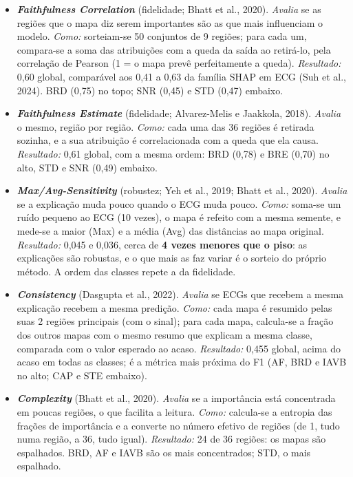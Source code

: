 \documentclass[11pt,a4paper]{article}
\newcommand{\Mx}[1]{\textit{#1}}
\begin{document}
\begin{itemize}
\item \textbf{\Mx{Faithfulness Correlation}} (fidelidade; Bhatt et al., 2020). \textit{Avalia} se as regiões que o mapa diz serem importantes são as que mais influenciam o modelo. \textit{Como:} sorteiam-se 50 conjuntos de 9 regiões; para cada um, compara-se a soma das atribuições com a queda da saída ao retirá-lo, pela correlação de Pearson (1 = o mapa prevê perfeitamente a queda). \textit{Resultado:} 0,60 global, comparável aos 0,41 a 0,63 da família SHAP em ECG (Suh et al., 2024). BRD (0,75) no topo; SNR (0,45) e STD (0,47) embaixo.

\item \textbf{\Mx{Faithfulness Estimate}} (fidelidade; Alvarez-Melis e Jaakkola, 2018). \textit{Avalia} o mesmo, região por região. \textit{Como:} cada uma das 36 regiões é retirada sozinha, e a sua atribuição é correlacionada com a queda que ela causa. \textit{Resultado:} 0,61 global, com a mesma ordem: BRD (0,78) e BRE (0,70) no alto, STD e SNR (0,49) embaixo.

\item \textbf{\Mx{Max/Avg-Sensitivity}} (robustez; Yeh et al., 2019; Bhatt et al., 2020). \textit{Avalia} se a explicação muda pouco quando o ECG muda pouco. \textit{Como:} soma-se um ruído pequeno ao ECG (10 vezes), o mapa é refeito com a mesma semente, e mede-se a maior (Max) e a média (Avg) das distâncias ao mapa original. \textit{Resultado:} 0,045 e 0,036, cerca de \textbf{4 vezes menores que o piso}: as explicações são robustas, e o que mais as faz variar é o sorteio do próprio método. A ordem das classes repete a da fidelidade.

\item \textbf{\Mx{Consistency}} (Dasgupta et al., 2022). \textit{Avalia} se ECGs que recebem a mesma explicação recebem a mesma predição. \textit{Como:} cada mapa é resumido pelas suas 2 regiões principais (com o sinal); para cada mapa, calcula-se a fração dos outros mapas com o mesmo resumo que explicam a mesma classe, comparada com o valor esperado ao acaso. \textit{Resultado:} 0,455 global, acima do acaso em todas as classes; é a métrica mais próxima do F1 (AF, BRD e IAVB no alto; CAP e STE embaixo).

\item \textbf{\Mx{Complexity}} (Bhatt et al., 2020). \textit{Avalia} se a importância está concentrada em poucas regiões, o que facilita a leitura. \textit{Como:} calcula-se a entropia das frações de importância e a converte no número efetivo de regiões (de 1, tudo numa região, a 36, tudo igual). \textit{Resultado:} 24 de 36 regiões: os mapas são espalhados. BRD, AF e IAVB são os mais concentrados; STD, o mais espalhado.


\end{itemize}
\end{document}
